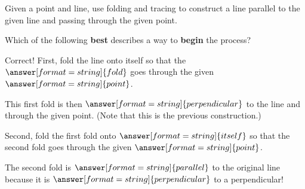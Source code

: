\documentclass[nooutcomes]{ximera}
\begin{document}
\begin{problem}
Given a point and line, use folding and tracing to construct a line parallel to the given line and passing through the given point. 
\begin{image}
\end{image}
Which of the following \textbf{best} describes a way to \textbf{begin} the process?  
\begin{multipleChoice}
\end{multipleChoice}
\begin{problem}
Correct!  First, fold the line onto itself so that the $\answer[format=string]{fold}$ goes through the given $\answer[format=string]{point}$.

This first fold is then $\answer[format=string]{perpendicular}$ to the line and through the given point.  (Note that this is the previous construction.)

Second, fold the first fold onto $\answer[format=string]{itself}$ so that the second fold goes through the given $\answer[format=string]{point}$.

The second fold is $\answer[format=string]{parallel}$ to the original line because it is $\answer[format=string]{perpendicular}$ to a perpendicular!  
\end{problem}
\end{problem}
\end{document}
